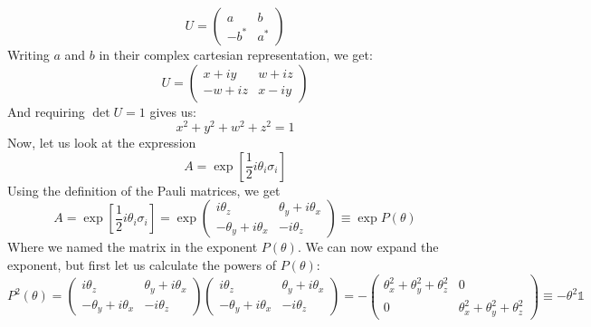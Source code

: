\documentclass{article}
\begin{document}
\begin{equation}
    U = \begin{pmatrix} a & b \\ -b^* & a^* \end{pmatrix}
\end{equation}
Writing $a$ and $b$ in their complex cartesian representation, we get:
\begin{equation}
    \label{eq:final_u}
    U = \begin{pmatrix} x + iy & w + iz \\ -w + iz & x - iy \end{pmatrix}
\end{equation}
And requiring $\det U = 1$ gives us:
\begin{equation}
    \label{eq:final_u_condition}
    x^2 + y^2 + w^2 + z^2 = 1
\end{equation}
Now, let us look at the expression
\begin{equation}
    A = \exp\left[\frac{1}{2} i\theta_i \sigma_i\right]
\end{equation}
Using the definition of the Pauli matrices, we get
\begin{equation}
    A = \exp\left[\frac{1}{2}i\theta_i \sigma_i\right] = \exp
        \begin{pmatrix}
            i\theta_z & \theta_y + i\theta_x \\
            - \theta_y+ i\theta_x & -i\theta_z
        \end{pmatrix} \equiv \exp P(\theta)
\end{equation}
Where we named the matrix in the exponent $P(\theta)$. We can now expand the exponent, but first let us calculate the powers of $P(\theta)$:
\begin{equation}
    P^2(\theta) = \begin{pmatrix}
            i\theta_z & \theta_y + i\theta_x \\
            - \theta_y+ i\theta_x & -i\theta_z
        \end{pmatrix}\begin{pmatrix}
            i\theta_z & \theta_y + i\theta_x \\
            - \theta_y+ i\theta_x & -i\theta_z
        \end{pmatrix}
        =
        -\begin{pmatrix}
            \theta_x^2 + \theta_y^2 + \theta_z^2 & 0 \\ 0 & \theta_x^2 + \theta_y^2 + \theta_z^2
        \end{pmatrix} \equiv -\theta^2 \mathbb{1}
\end{equation}
\end{document}
